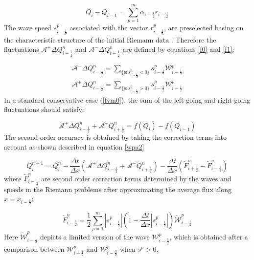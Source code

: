 \documentclass[12pt,a4paper]{article}
\newcommand{\donna}[1]{{\color{red}{#1}}}
\begin{document}
	\begin{equation}
		Q_{i} -  Q_{i-1} = \sum_{p=1}^{m}  \alpha_{i-\frac{1}{2}} r_{i-\frac{1}{2}}
		\label{wpa19}
	\end{equation}
	  The wave speed $s_{i-\frac{1}{2}}^{p}$ associated with the vector $r_{i-\frac{1}{2}}^{p}$, are preselected basing on the characteristic structure of the initial Riemann data \cite{ge:2008}. Therefore the fluctuations $\mathcal{A^{+}}\Delta Q_{i-\frac{1}{2}}^{n}$  and $\mathcal{A^{-}}\Delta Q_{i-\frac{1}{2}}^{n} $ are defined by equations \eqref{f0} and \eqref{f1}:
	
	\begin{eqnarray}
		\mathcal{A^{-}}\Delta Q_{i-\frac{1}{2}}^{n} = \sum_{\{ p:s_{i-\frac{1}{2}}^{p}<0\}} s_{i-\frac{1}{2}}^{p} \mathcal{W}_{i-\frac{1}{2}}^{p}
		\label{f0}\\
		\mathcal{A^{+}}\Delta Q_{i-\frac{1}{2}}^{n} =\sum_{\{ p:s_{i-\frac{1}{2}}^{p}>0\}} s_{i-\frac{1}{2}}^{p} \mathcal{W}_{i-\frac{1}{2}}^{p}
		\label{f1}
	\end{eqnarray}
	  In a standard  conservative case (\eqref{fvm0}), the sum of the left-going and right-going fluctuations should satisfy:
	
	\begin{equation}
		\mathcal{A^{+}}\Delta 	Q_{i-\frac{1}{2}}^{n} + \mathcal{A^{-}}Q_{i+\frac{1}{2}}^{n} = f(Q_{i}) - f(Q_{i-1})
	\end{equation}
	The second order accuracy is obtained by taking the correction terms into account as shown described in equation \eqref{wpa2}
	
	\begin{equation}
		Q_{i}^{n+1} =  Q_{i}^{n} - \frac{\Delta t}{\Delta x}(\mathcal{A^{+}}\Delta 	Q_{i-\frac{1}{2}}^{n} + \mathcal{A^{-}}Q_{i+\frac{1}{2}}^{n}) -  \frac{\Delta t}{\Delta x} (\tilde{F}_{i+\frac{1}{2}}^{n} - \tilde{F}_{i-\frac{1}{2}}^{n} )
		\label{wpa2}
	\end{equation}
	  where $\tilde{F}_{i-\frac{1}{2}}^{n} $ are second order correction terms determined by the waves and speeds in the Riemann problems after approximating the average flux along  $x = x_{i - \frac{1}{2}}$:
	
	\begin{equation}
		\tilde{F}_{i-\frac{1}{2}}^{n} = \frac{1}{2} \sum_{p=1}^{m}  |s_{i- \frac{1}{2}}^{p}| \left( 1 - \frac{\Delta t}{\Delta x} |s_{i- \frac{1}{2}}^{p}|\right) \tilde{\mathcal{W}}_{i-\frac{1}{2}}^{p} 
		\label{wpa13}
	\end{equation}
	  Here $\tilde{\mathcal{W}}_{i-\frac{1}{2}}^{p} $ depicts a limited version of the wave $\mathcal{W}_{i-\frac{1}{2}}^{p} $, which is obtained after a comparison between $\mathcal{W}_{i-\frac{1}{2}}^{p} $ and $\mathcal{W}_{i-\frac{3}{2}}^{p} $ when $s^{p} >0$.\\
	
\end{document}
